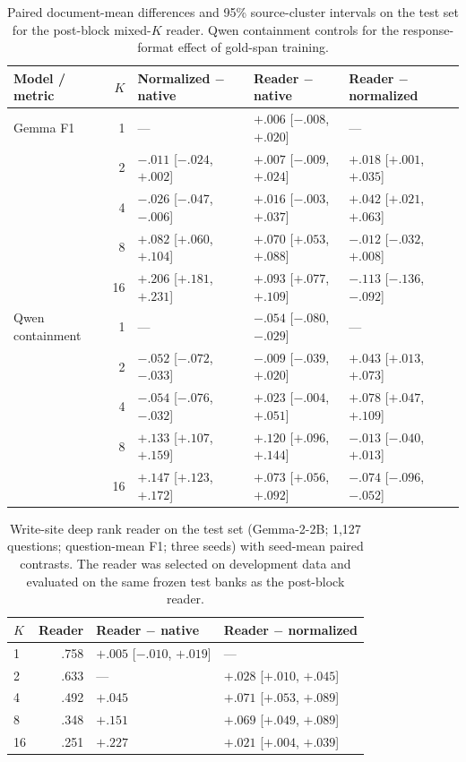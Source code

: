 \begin{table}[t]
\centering
\caption{Paired document-mean differences and 95\% source-cluster intervals on the
test set for the post-block mixed-$K$ reader. Qwen containment controls
for the response-format effect of gold-span training.}
\label{tab:contrasts}
\small\setlength{\tabcolsep}{5pt}
\begin{tabular}{@{}lrlll@{}}
\toprule
Model / metric & $K$ & Normalized $-$ native & Reader $-$ native & Reader $-$ normalized \\
\midrule
Gemma F1 & 1 & --- & $+.006$ [$-.008$, $+.020$] & --- \\
& 2 & $-.011$ [$-.024$, $+.002$] & $+.007$ [$-.009$, $+.024$] & $+.018$ [$+.001$, $+.035$] \\
& 4 & $-.026$ [$-.047$, $-.006$] & $+.016$ [$-.003$, $+.037$] & $+.042$ [$+.021$, $+.063$] \\
& 8 & $+.082$ [$+.060$, $+.104$] & $+.070$ [$+.053$, $+.088$] & $-.012$ [$-.032$, $+.008$] \\
& 16 & $+.206$ [$+.181$, $+.231$] & $+.093$ [$+.077$, $+.109$] & $-.113$ [$-.136$, $-.092$] \\
\midrule
Qwen containment & 1 & --- & $-.054$ [$-.080$, $-.029$] & --- \\
& 2 & $-.052$ [$-.072$, $-.033$] & $-.009$ [$-.039$, $+.020$] & $+.043$ [$+.013$, $+.073$] \\
& 4 & $-.054$ [$-.076$, $-.032$] & $+.023$ [$-.004$, $+.051$] & $+.078$ [$+.047$, $+.109$] \\
& 8 & $+.133$ [$+.107$, $+.159$] & $+.120$ [$+.096$, $+.144$] & $-.013$ [$-.040$, $+.013$] \\
& 16 & $+.147$ [$+.123$, $+.172$] & $+.073$ [$+.056$, $+.092$] & $-.074$ [$-.096$, $-.052$] \\
\bottomrule
\end{tabular}
\end{table}

\begin{table}[t]
\centering
\caption{Write-site deep rank reader on the test set (Gemma-2-2B; 1,127
questions; question-mean F1; three seeds) with seed-mean paired contrasts.
The reader was selected on development data and evaluated on the same frozen
test banks as the post-block reader.}
\label{tab:confirmation}
\small\setlength{\tabcolsep}{4pt}
\begin{tabular}{@{}lrll@{}}
\toprule
$K$ & Reader & Reader $-$ native & Reader $-$ normalized \\
\midrule
1 & .758 & $+.005$ [$-.010$, $+.019$] & --- \\
2 & .633 & --- & $+.028$ [$+.010$, $+.045$] \\
4 & .492 & $+.045$ & $+.071$ [$+.053$, $+.089$] \\
8 & .348 & $+.151$ & $+.069$ [$+.049$, $+.089$] \\
16 & .251 & $+.227$ & $+.021$ [$+.004$, $+.039$] \\
\bottomrule
\end{tabular}
\end{table}

